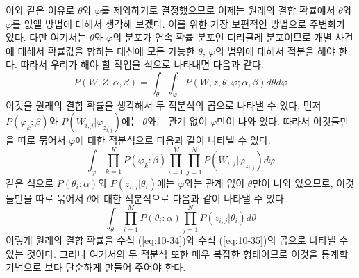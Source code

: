 \documentclass[a4paper]{oblivoir}
\begin{document}
이와 같은 이유로 $\theta$와 $\varphi$를 제외하기로 결정했으므로 이제는 원래의 결합 확률에서 $\theta$와 $\varphi$를 없앨 방법에 대해서 생각해 보겠다. 이를 위한 가장 보편적인 방법으로 주변화가 있다. 다만 여기서는 $\theta$와 $\varphi$의 분포가 연속 확률 분포인 디리클레 분포이므로 개별 사건에 대해서 확률값을 합하는 대신에 모든 가능한 $\theta$, $\varphi$의 범위에 대해서 적분을 해야 한다. 따라서 우리가 해야 할 작업을 식으로 나타내면 다음과 같다.   
\begin{equation}
P(W,Z ; \alpha,\beta) = \int_{\theta} \int_{\varphi} P(W,z,\theta,\varphi ; \alpha,\beta) d\theta d\varphi
\label{eq:10-33}
\end{equation}
이것을 원래의 결합 확률을 생각해서 두 적분식의 곱으로 나타낼 수 있다. 먼저 $P(\varphi_k:\beta)$와 $P(W_{i,j}|\varphi_{z_{i,j}})$에는 $\theta$와는 관계 없이 $\varphi$만이 나와 있다. 따라서 이것들만을 따로 묶어서 $\varphi$에 대한 적분식으로 다음과 같이 나타낼 수 있다.     
\begin{equation}
\int_{\varphi} \prod_{k=1}^{K} P(\varphi_k:\beta) \prod_{i=1}^{M} \prod_{j=1}^{N} P(W_{i,j}|\varphi_{z_{i,j}}) d\varphi
\label{eq:10-34}
\end{equation} 
같은 식으로 $P(\theta_i:\alpha)$와 $P(z_{i,j}|\theta_i)$에는 $\varphi$와는 관계 없이 $\theta$만이 나와 있으므로, 이것들만을 따로 묶어서 $\theta$에 대한 적분식으로 다음과 같이 나타낼 수 있다. 
\begin{equation}
\int_{\theta} \prod_{i=1}^{M} P(\theta_i:\alpha) \prod_{j=1}^{N} P(z_{i,j}|\theta_i)  d\theta  
\label{eq:10-35}
\end{equation} 
이렇게 원래의 결합 확률을 수식 (\ref{eq:10-34})와 수식 (\ref{eq:10-35})의 곱으로 나타낼 수 있는 것이다. 그러나 여기서의 두 적분식 또한 매우 복잡한 형태이므로 이것을 통계학 기법으로 보다 단순하게 만들어 주어야 한다. \\
\end{document}
